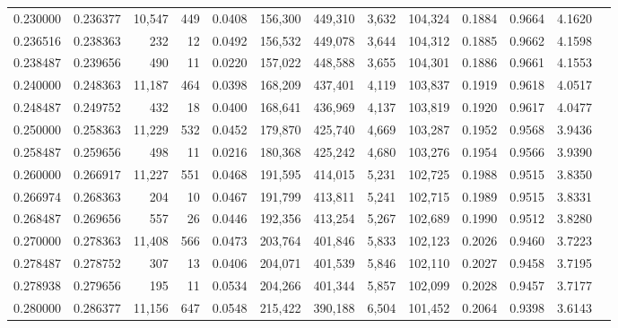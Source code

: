 \begin{tabular}{rrrrrrrrrrrrr}
0.230000 & 0.236377 & 10,547 &   449 &                                     0.0408 & 156,300 & 449,310 &   3,632 & 104,324 & 0.1884 & 0.9664 & 4.1620 \\
0.236516 & 0.238363 &    232 &    12 &                                     0.0492 & 156,532 & 449,078 &   3,644 & 104,312 & 0.1885 & 0.9662 & 4.1598 \\
0.238487 & 0.239656 &    490 &    11 &                                     0.0220 & 157,022 & 448,588 &   3,655 & 104,301 & 0.1886 & 0.9661 & 4.1553 \\
0.240000 & 0.248363 & 11,187 &   464 &                                     0.0398 & 168,209 & 437,401 &   4,119 & 103,837 & 0.1919 & 0.9618 & 4.0517 \\
0.248487 & 0.249752 &    432 &    18 &                                     0.0400 & 168,641 & 436,969 &   4,137 & 103,819 & 0.1920 & 0.9617 & 4.0477 \\
0.250000 & 0.258363 & 11,229 &   532 &                                     0.0452 & 179,870 & 425,740 &   4,669 & 103,287 & 0.1952 & 0.9568 & 3.9436 \\
0.258487 & 0.259656 &    498 &    11 &                                     0.0216 & 180,368 & 425,242 &   4,680 & 103,276 & 0.1954 & 0.9566 & 3.9390 \\
0.260000 & 0.266917 & 11,227 &   551 &                                     0.0468 & 191,595 & 414,015 &   5,231 & 102,725 & 0.1988 & 0.9515 & 3.8350 \\
0.266974 & 0.268363 &    204 &    10 &                                     0.0467 & 191,799 & 413,811 &   5,241 & 102,715 & 0.1989 & 0.9515 & 3.8331 \\
0.268487 & 0.269656 &    557 &    26 &                                     0.0446 & 192,356 & 413,254 &   5,267 & 102,689 & 0.1990 & 0.9512 & 3.8280 \\
0.270000 & 0.278363 & 11,408 &   566 &                                     0.0473 & 203,764 & 401,846 &   5,833 & 102,123 & 0.2026 & 0.9460 & 3.7223 \\
0.278487 & 0.278752 &    307 &    13 &                                     0.0406 & 204,071 & 401,539 &   5,846 & 102,110 & 0.2027 & 0.9458 & 3.7195 \\
0.278938 & 0.279656 &    195 &    11 &                                     0.0534 & 204,266 & 401,344 &   5,857 & 102,099 & 0.2028 & 0.9457 & 3.7177 \\
0.280000 & 0.286377 & 11,156 &   647 &                                     0.0548 & 215,422 & 390,188 &   6,504 & 101,452 & 0.2064 & 0.9398 & 3.6143 \\

\end{tabular}
